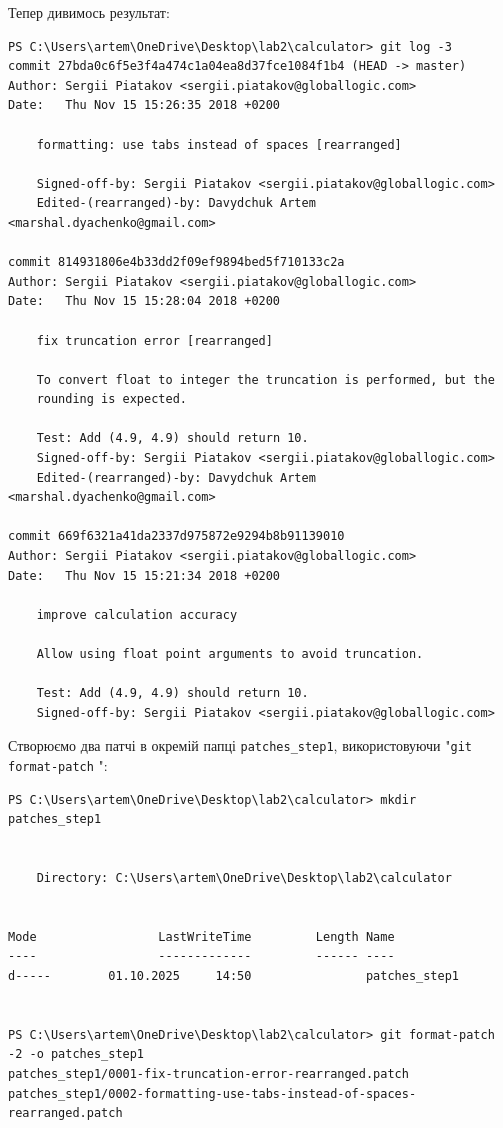 \documentclass[12pt,a4paper]{article}
\begin{document}
    Тепер дивимось результат:
    \begin{verbatim}
PS C:\Users\artem\OneDrive\Desktop\lab2\calculator> git log -3
commit 27bda0c6f5e3f4a474c1a04ea8d37fce1084f1b4 (HEAD -> master)
Author: Sergii Piatakov <sergii.piatakov@globallogic.com>
Date:   Thu Nov 15 15:26:35 2018 +0200

    formatting: use tabs instead of spaces [rearranged]

    Signed-off-by: Sergii Piatakov <sergii.piatakov@globallogic.com>
    Edited-(rearranged)-by: Davydchuk Artem <marshal.dyachenko@gmail.com>

commit 814931806e4b33dd2f09ef9894bed5f710133c2a
Author: Sergii Piatakov <sergii.piatakov@globallogic.com>
Date:   Thu Nov 15 15:28:04 2018 +0200

    fix truncation error [rearranged]

    To convert float to integer the truncation is performed, but the
    rounding is expected.

    Test: Add (4.9, 4.9) should return 10.
    Signed-off-by: Sergii Piatakov <sergii.piatakov@globallogic.com>
    Edited-(rearranged)-by: Davydchuk Artem <marshal.dyachenko@gmail.com>

commit 669f6321a41da2337d975872e9294b8b91139010
Author: Sergii Piatakov <sergii.piatakov@globallogic.com>
Date:   Thu Nov 15 15:21:34 2018 +0200

    improve calculation accuracy

    Allow using float point arguments to avoid truncation.

    Test: Add (4.9, 4.9) should return 10.
    Signed-off-by: Sergii Piatakov <sergii.piatakov@globallogic.com>
    \end{verbatim}

    Створюємо два патчі в окремій папці \texttt{patches\_step1}, використовуючи "\texttt{git format-patch} ":
    \begin{verbatim}
PS C:\Users\artem\OneDrive\Desktop\lab2\calculator> mkdir patches_step1


    Directory: C:\Users\artem\OneDrive\Desktop\lab2\calculator


Mode                 LastWriteTime         Length Name
----                 -------------         ------ ----
d-----        01.10.2025     14:50                patches_step1


PS C:\Users\artem\OneDrive\Desktop\lab2\calculator> git format-patch -2 -o patches_step1
patches_step1/0001-fix-truncation-error-rearranged.patch
patches_step1/0002-formatting-use-tabs-instead-of-spaces-rearranged.patch
    \end{verbatim}
\end{document}
